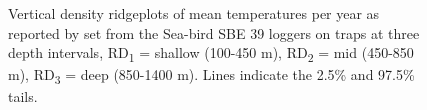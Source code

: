\documentclass[12pt]{article}\usepackage[]{graphicx}\usepackage[]{color}
\begin{document}
\begin{figure}[htb]

{\centering {} 

}

\caption{Vertical density ridgeplots of mean temperatures per year as reported by set from the Sea-bird SBE 39 loggers on traps at three depth intervals, RD\textsubscript{1} = shallow (100-450 m), RD\textsubscript{2} = mid (450-850 m), RD\textsubscript{3} = deep (850-1400 m). Lines indicate the 2.5\% and 97.5\% tails.}\label{fig:figure18}
\end{figure}
\clearpage
\end{document}
